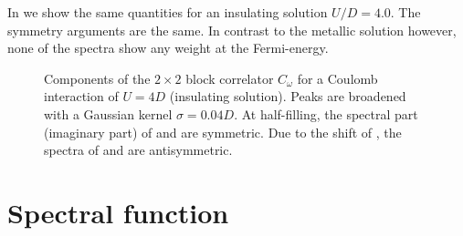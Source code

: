 In  we show the same quantities
for an insulating solution $U/D=4.0$.
The symmetry arguments are the same.
In contrast to the metallic solution however,
none of the spectra show any weight at the Fermi-energy.
\begin{figure}[ht]
    \centering
    
    \caption{
        Components of the $2\times2$ block correlator $C_\omega$ for
        a Coulomb interaction of $U=4D$ (insulating solution).
        Peaks are broadened with a Gaussian kernel $\sigma=0.04D$.
        At half-filling, the spectral part (imaginary part) of
         and 
        are symmetric.
        Due to the shift of , the spectra of
         and 
        are antisymmetric.
    }%
    \label{fig:correlators-insulator}
\end{figure}

\section{Spectral function}

